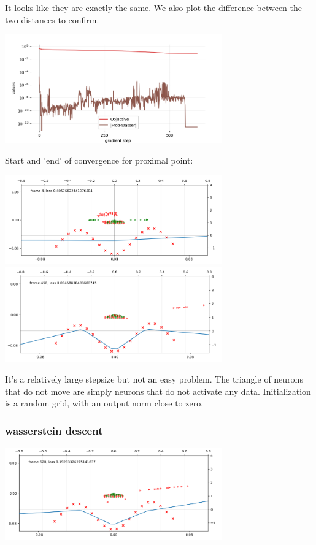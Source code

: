 It looks like they are exactly the same. We also plot the difference between the two distances to confirm.

\includegraphics[width=0.7\textwidth]{imgs/tau10_graph.png}

Start and 'end' of convergence for proximal point:

\includegraphics[width=0.7\textwidth]{imgs/tau10_plot_start.png}
\includegraphics[width=0.7\textwidth]{imgs/tau10_plot_end.png}

It's a relatively large stepsize but not an easy problem. The triangle of neurons that do not move are simply neurons that do not activate any data. Initialization is a random grid, with an output norm close to zero.

\subsubsection{wasserstein descent}

\includegraphics[width=0.7\textwidth]{imgs/tau10_plot_wasser_end.png}

